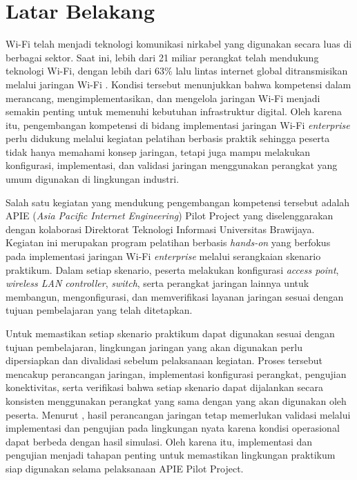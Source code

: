 
\section{Latar Belakang}

Wi-Fi telah menjadi teknologi komunikasi nirkabel yang digunakan secara luas di berbagai sektor. Saat ini, lebih dari 21 miliar perangkat telah mendukung teknologi Wi-Fi, dengan lebih dari 63\% lalu lintas internet global ditransmisikan melalui jaringan Wi-Fi \parencite{GERACI_WIFI_2025}. Kondisi tersebut menunjukkan bahwa kompetensi dalam merancang, mengimplementasikan, dan mengelola jaringan Wi-Fi menjadi semakin penting untuk memenuhi kebutuhan infrastruktur digital. Oleh karena itu, pengembangan kompetensi di bidang implementasi jaringan Wi-Fi \textit{enterprise} perlu didukung melalui kegiatan pelatihan berbasis praktik sehingga peserta tidak hanya memahami konsep jaringan, tetapi juga mampu melakukan konfigurasi, implementasi, dan validasi jaringan menggunakan perangkat yang umum digunakan di lingkungan industri.

Salah satu kegiatan yang mendukung pengembangan kompetensi tersebut adalah APIE (\textit{Asia Pacific Internet Engineering}) Pilot Project yang diselenggarakan dengan kolaborasi Direktorat Teknologi Informasi Universitas Brawijaya. Kegiatan ini merupakan program pelatihan berbasis \textit{hands-on} yang berfokus pada implementasi jaringan Wi-Fi \textit{enterprise} melalui serangkaian skenario praktikum. Dalam setiap skenario, peserta melakukan konfigurasi \textit{access point}, \textit{wireless LAN controller}, \textit{switch}, serta perangkat jaringan lainnya untuk membangun, mengonfigurasi, dan memverifikasi layanan jaringan sesuai dengan tujuan pembelajaran yang telah ditetapkan.

Untuk memastikan setiap skenario praktikum dapat digunakan sesuai dengan tujuan pembelajaran, lingkungan jaringan yang akan digunakan perlu dipersiapkan dan divalidasi sebelum pelaksanaan kegiatan. Proses tersebut mencakup perancangan jaringan, implementasi konfigurasi perangkat, pengujian konektivitas, serta verifikasi bahwa setiap skenario dapat dijalankan secara konsisten menggunakan perangkat yang sama dengan yang akan digunakan oleh peserta. Menurut \textcite{BRIDOVA_WIFI_DESIGN_2023}, hasil perancangan jaringan tetap memerlukan validasi melalui implementasi dan pengujian pada lingkungan nyata karena kondisi operasional dapat berbeda dengan hasil simulasi. Oleh karena itu, implementasi dan pengujian menjadi tahapan penting untuk memastikan lingkungan praktikum siap digunakan selama pelaksanaan APIE Pilot Project.

